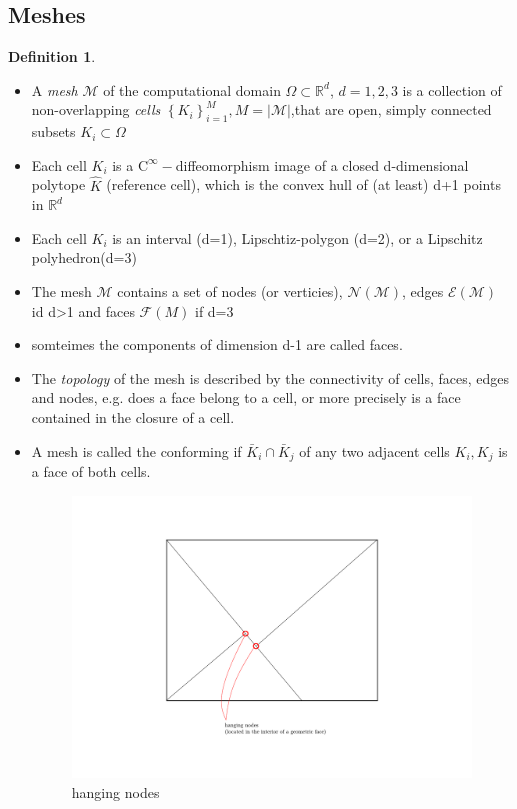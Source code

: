 \documentclass[english]{article}
\theoremstyle{definition}
\newtheorem*{defi}{Definition}
\theoremstyle{remark}
\newcommand{\M}{\mathcal{M}}
\newcommand{\N}{\mathcal{N}}
\newcommand{\E}{\mathcal{E}}
\newcommand{\RR}{\mathbb{R}}			%
\newcommand{\F}{\mathcal{F}}
\newcommand{\OO}{\Omega}
\newcommand{\cinf}{\tx{C}^\infty}
\newcommand{\tx}[1]{\text{#1}}
\begin{document}
\subsection{Meshes}
\begin{defi}
  \begin{itemize}
  \item A \emph{mesh} $\mathcal{M}$ of the computational domain $\OO\subset \RR^d$, $d=1,2,3$ is a collection of non-overlapping \emph{cells} $\left\{K_i \right\}^M_{i=1} , M = |\mathcal{M}|$,that are open, simply connected subsets $K_i \subset \OO$
  \item Each cell $K_i$ is a $\cinf-$diffeomorphism image of a closed d-dimensional polytope $\hat K$ (reference cell), which is the convex hull of (at least) d+1 points  in $\RR^d$\\
  \item Each cell $K_i$ is an interval (d=1), Lipschtiz-polygon (d=2), or a Lipschitz polyhedron(d=3)\\
  \item The mesh $\mathcal{M}$ contains a set of nodes (or verticies), $\N(\M)$, edges $\E(\M)$ id d>1 and faces $\F(M)$ if d=3\\
  \item somteimes the components of dimension d-1 are called faces.\\
  \item The \emph{topology} of the mesh is described by the connectivity of cells, faces, edges and nodes, e.g. does a face belong to a cell, or more precisely is a face contained in the closure of a cell.
  \item A mesh is called the conforming if $\bar K_i \cap \bar K_j$ of any two adjacent cells $K_i,K_j$ is a face of both cells.
    \begin{figure}[H]
      \begin{center}
        \includegraphics[width=\textwidth]{figs/hangingNodes.pdf}
      \end{center}
      \caption{hanging nodes}
      \label{hanging-nodes-figure}
    \end{figure}


\end{itemize}
\end{defi}
\end{document}
